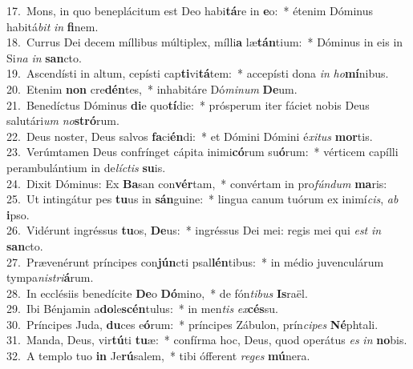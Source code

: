 {17.~}Mons, in quo beneplácitum est Deo habi\textbf{tá}re in \textbf{e}o:~* étenim Dóminus habitá\textit{bit} \textit{in} \textbf{fi}nem.\\
{18.~}Currus Dei decem míllibus múltiplex, mílli\textbf{a} læ\textbf{tán}tium:~* Dóminus in eis in Si\textit{na} \textit{in} \textbf{san}cto.\\
{19.~}Ascendísti in altum, cepísti cap\textbf{ti}vi\textbf{tá}tem:~* accepísti dona \textit{in} \textit{ho}\textbf{mí}nibus.\\
{20.~}Etenim \textbf{non} cre\textbf{dén}tes,~* inhabitáre Dó\textit{mi}\textit{num} \textbf{De}um.\\
{21.~}Benedíctus Dóminus \textbf{di}e quo\textbf{tí}die:~* prósperum iter fáciet nobis Deus salutári\textit{um} \textit{no}\textbf{stró}rum.\\
{22.~}Deus noster, Deus salvos \textbf{fa}ci\textbf{én}di:~* et Dómini Dómini é\textit{xi}\textit{tus} \textbf{mor}tis.\\
{23.~}Verúmtamen Deus confrínget cápita inimi\textbf{có}rum su\textbf{ó}rum:~* vérticem capílli perambulántium in de\textit{lí}\textit{ctis} \textbf{su}is.\\
{24.~}Dixit Dóminus: Ex \textbf{Ba}san con\textbf{vér}tam,~* convértam in pro\textit{fún}\textit{dum} \textbf{ma}ris:\\
{25.~}Ut intingátur pes \textbf{tu}us in \textbf{sán}guine:~* lingua canum tuórum ex inimí\textit{cis}, \textit{ab} \textbf{i}pso.\\
{26.~}Vidérunt ingréssus \textbf{tu}os, \textbf{De}us:~* ingréssus Dei mei: regis mei qui \textit{est} \textit{in} \textbf{san}cto.\\
{27.~}Prævenérunt príncipes con\textbf{jún}cti psal\textbf{lén}tibus:~* in médio juvenculárum tympa\textit{ni}\textit{stri}\textbf{á}rum.\\
{28.~}In ecclésiis benedícite \textbf{De}o \textbf{Dó}mino,~* de fón\textit{ti}\textit{bus} \textbf{Is}raël.\\
{29.~}Ibi Bénjamin a\textbf{do}le\textbf{scén}tulus:~* in men\textit{tis} \textit{ex}\textbf{cés}su.\\
{30.~}Príncipes Juda, \textbf{du}ces e\textbf{ó}rum:~* príncipes Zábulon, prín\textit{ci}\textit{pes} \textbf{Né}phtali.\\
{31.~}Manda, Deus, vir\textbf{tú}ti \textbf{tu}æ:~* confírma hoc, Deus, quod operátus \textit{es} \textit{in} \textbf{no}bis.\\
{32.~}A templo tuo \textbf{in} Je\textbf{rú}salem,~* tibi ófferent \textit{re}\textit{ges} \textbf{mú}nera.\\
